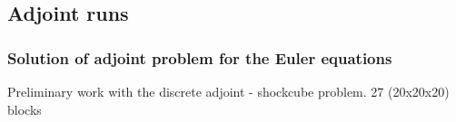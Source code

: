 \documentclass{beamer}
\begin{document}
\subsection{Adjoint runs}
\begin{frame}
\frametitle{Solution of adjoint problem for the Euler equations}
\begin{minipage}[t][1\textheight]{1\textwidth}
\vspace{-20pt}
\begin{exampleblock}{Preliminary work with the discrete adjoint - shockcube problem. 27 (20x20x20) blocks}
\vspace{-20pt}
\tiny
\begin{figure}
\label{fig:Blkshockedcube}
\centering
{}

\end{figure}
\end{exampleblock}
\end{minipage}
\end{frame}
\end{document}
